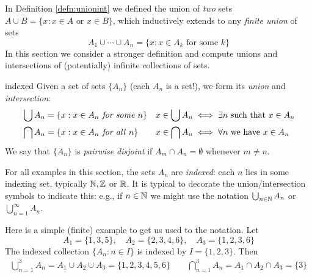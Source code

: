 In Definition \ref{defn:unionint} we defined the union of \emph{two} sets $A\cup B=\{x:x\in A\text{ or }x\in B\}$, which inductively extends to any \emph{finite union} of sets
\[
	A_1\cup\cdots\cup A_n=\{x:x\in A_k\text{ for some }k\}
\]
In this section we consider a stronger definition and compute unions and intersections of (potentially) infinite collections of sets.

\begin{defn}{}{indexed}
	Given a set of sets $\{A_n\}$ (each $A_n$ is a set!), we form its \emph{union} and \emph{intersection}:
	\begin{align*}
		&\bigcup A_n=\{x:x\in A_n\text{\emph{ for some} }n\} &&x\in\bigcup A_n\iff \exists n\text{ such that }x\in A_n\\
		&\bigcap A_n=\{x:x\in A_n\text{\emph{ for all} }n\} &&x\in\bigcap A_n\iff \forall n\text{ we have }x\in A_n
	\end{align*}
	We say that $\{A_n\}$ is \emph{pairwise disjoint} if $A_m\cap A_n=\emptyset$ whenever $m\neq n$.
\end{defn}

For all examples in this section, the sets $A_n$ are \emph{indexed}: each $n$ lies in some indexing set, typically $\mathbb{N},\mathbb{Z}$ or $\mathbb{R}$. It is typical to decorate the union/intersection symbols to indicate this: e.g., if $n\in\mathbb{N}$ we might use the notation $\bigcup_{n\in\mathbb{N}} A_n$ or $\bigcup_{n=1}^{\infty} A_n$.



\begin{example}{}{}
	Here is a simple (finite) example to get us used to the notation. Let
	\[
		A_1=\{1,3,5\},\quad A_2=\{2,3,4,6\},\quad A_3=\{1,2,3,6\}
	\]
	The indexed collection $\{A_n:n\in I\}$ is indexed by $I=\{1,2,3\}$. Then
	\begin{gather*}
		\bigcup_{n=1}^3A_n =A_1\cup A_2\cup A_3=\{1,2,3,4,5,6\} \qquad
		\bigcap_{n=1}^3A_n =A_1\cap A_2\cap A_3=\{3\}
	\end{gather*}
\end{example}


